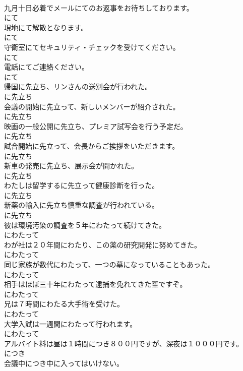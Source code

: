 \documentclass[8pt]{extreport}
\begin{document}
\begin{CJK}{UTF8}{min}
\\	九月十日必着でメールにてのお返事をお待ちしております。	
\\	にて
\\	現地にて解散となります。	
\\	にて
\\	守衛室にてセキュリティ・チェックを受けてください。	
\\	にて
\\	電話にてご連絡ください。	
\\	にて
\\	帰国に先立ち、リンさんの送別会が行われた。	
\\	に先立ち
\\	会議の開始に先立って、新しいメンバーが紹介された。	
\\	に先立ち
\\	映画の一般公開に先立ち、プレミア試写会を行う予定だ。	
\\	に先立ち
\\	試合開始に先立って、会長からご挨拶をいただきます。	
\\	に先立ち
\\	新車の発売に先立ち、展示会が開かれた。	
\\	に先立ち
\\	わたしは留学するに先立って健康診断を行った。	
\\	に先立ち
\\	新薬の輸入に先立ち慎重な調査が行われている。	
\\	に先立ち
\\	彼は環境汚染の調査を５年にわたって続けてきた。	
\\	にわたって
\\	わが社は２０年間にわたり、この薬の研究開発に努めてきた。	
\\	にわたって
\\	同じ家族が数代にわたって、一つの墓になっていることもあった。	
\\	にわたって
\\	相手はほぼ三十年にわたって逮捕を免れてきた輩ですぞ。	
\\	にわたって
\\	兄は７時間にわたる大手術を受けた。	
\\	にわたって
\\	大学入試は一週間にわたって行われます。	
\\	にわたって
\\	アルバイト料は昼は１時間につき８００円ですが、深夜は１０００円です。	
\\	につき
\\	会議中につき中に入ってはいけない。	

\end{CJK}
\end{document}
